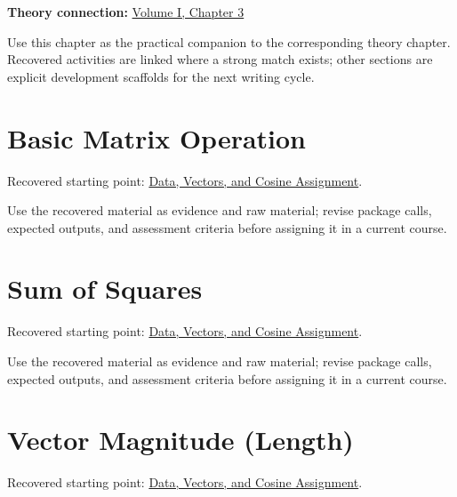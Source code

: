 \documentclass[
  letterpaper,
]{scrbook}
\begin{document}

\textbf{Theory connection:} \hyperref[ch-matrix]{Volume I, Chapter 3}

Use this chapter as the practical companion to the corresponding theory
chapter. Recovered activities are linked where a strong match exists;
other sections are explicit development scaffolds for the next writing
cycle.

\section*{Basic Matrix
Operation}\label{sec-pr-03-basic-matrix-operation}


Recovered starting point:
\hyperref[sec-lab-data-initialization-assignment]{Data, Vectors, and
Cosine Assignment}.

Use the recovered material as evidence and raw material; revise package
calls, expected outputs, and assessment criteria before assigning it in
a current course.

\section*{Sum of Squares}\label{sec-pr-03-sum-of-squares}


Recovered starting point:
\hyperref[sec-lab-data-initialization-assignment]{Data, Vectors, and
Cosine Assignment}.

Use the recovered material as evidence and raw material; revise package
calls, expected outputs, and assessment criteria before assigning it in
a current course.

\section*{Vector Magnitude
(Length)}\label{sec-pr-03-vector-magnitude-length}


Recovered starting point:
\hyperref[sec-lab-data-initialization-assignment]{Data, Vectors, and
Cosine Assignment}.
\end{document}
